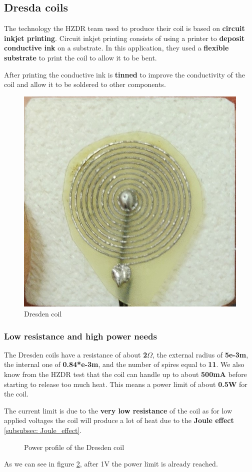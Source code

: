 \subsection{Dresda coils}
The technology the HZDR team used to produce their coil is based on \textbf{circuit inkjet printing}.
Circuit inkjet printing consists of using a printer to \textbf{deposit conductive ink} on a substrate.
In this application, they used a \textbf{flexible substrate} to print the coil to allow it to be bent.

\begin{samepage}
    After printing the conductive ink is \textbf{tinned} to improve the conductivity of the coil and allow it to be soldered to other components.
    \nopagebreak

    \begin{figure}[H]
        \centering
        \includegraphics[width=0.4\linewidth]{Chapters/Chapter5/Coils_alternatives/Figures/Dresden_coil.jpg}
        \caption{Dresden coil \cite{HZDR}}
        \label{fig: Dresden_coil} 
    \end{figure}
\end{samepage}


\subsubsection{Low resistance and high power needs}
The Dresden coils have a resistance of about \textbf{2$\Omega$}, the external radius of \textbf{5e-3m}, the internal one of \textbf{0.84*e-3m}, and the number of spires equal to \textbf{11}.
We also know from the HZDR test that the coil can handle up to about \textbf{500mA} before starting to release too much heat.
This means a power limit of about \textbf{0.5W} for the coil.

\begin{samepage}
    The current limit is due to the \textbf{very low resistance} of the coil as for low applied voltages the coil will produce a lot of heat due to the \textbf{Joule effect} \ref{subsubsec: Joule_effect}.

    \begin{figure}[H]
        \centering
        \resizebox{0.5\textwidth}{!}{
            
        }
        \caption{Power profile of the Dresden coil}
        \label{fig: Dresden_heat_graph}
    \end{figure}
    As we can see in figure \ref{fig: Dresden_heat_graph}, after 1V the power limit is already reached.
\end{samepage}


